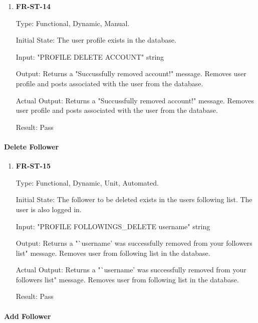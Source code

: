 \documentclass[12pt, titlepage]{article}
\begin{document}
\begin{enumerate}

\item{\textbf{FR-ST-14}}

Type: Functional, Dynamic, Manual.
					
Initial State: The user profile exists in the database.
					
Input: "PROFILE DELETE ACCOUNT" string
					
Output: Returns a "Succussfully removed account!" message. Removes user profile and posts associated with the user from the database.


Actual Output: Returns a "Succussfully removed account!" message. Removes user profile and posts associated with the user from the database.
					
Result: Pass
\end{enumerate}

\paragraph{Delete Follower}

\begin{enumerate}

\item{\textbf{FR-ST-15}}

Type: Functional, Dynamic, Unit, Automated.
					
Initial State: The follower to be deleted exists in the users following list. The user is also logged in.
					
Input: "PROFILE FOLLOWINGS\_DELETE username" string
					
Output: Returns a "`username' was successfully removed from your followers list" message. Removes user from following list in the database.


Actual Output: Returns a "`username' was successfully removed from your followers list" message. Removes user from following list in the database.
					
Result: Pass
\end{enumerate}

\paragraph{Add Follower}
\end{document}
